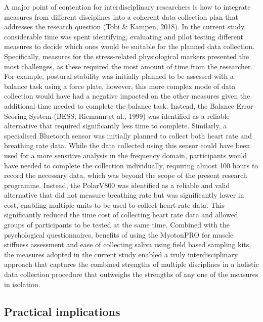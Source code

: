 \documentclass[
  english,
  man,floatsintext]{apa6}
\begin{document}
A major point of contention for interdisciplinary researchers is how to integrate measures from different disciplines into a coherent data collection plan that addresses the research question (Tobi \& Kampen, 2018).
In the current study, considerable time was spent identifying, evaluating and pilot testing different measures to decide which ones would be suitable for the planned data collection.
Specifically, measures for the stress-related physiological markers presented the most challenges, as these required the most amount of time from the researcher.
For example, postural stability was initially planned to be assessed with a balance task using a force plate, however, this more complex mode of data collection would have had a negative impacted on the other measures given the additional time needed to complete the balance task.
Instead, the Balance Error Scoring System (BESS; Riemann et al., 1999) was identified as a reliable alternative that required significantly less time to complete.
Similarly, a specialised Bluetooth sensor was initially planned to collect both heart rate and breathing rate data.
While the data collected using this sensor could have been used for a more sensitive analysis in the frequency domain, participants would have needed to complete the collection individually, requiring almost 100 hours to record the necessary data, which was beyond the scope of the present research programme.
Instead, the PolarV800 was identified as a reliable and valid alternative that did not measure breathing rate but was significantly lower in cost, enabling multiple units to be used to collect heart rate data.
This significantly reduced the time cost of collecting heart rate data and allowed groups of participants to be tested at the same time.
Combined with the psychological questionnaires, benefits of using the MyotonPRO for muscle stiffness assessment and ease of collecting saliva using field based sampling kits, the measures adopted in the current study enabled a truly interdisciplinary approach that captures the combined strengths of multiple disciplines in a holistic data collection procedure that outweighs the strengths of any one of the measures in isolation.

\hypertarget{practical-implications}{%
\subsection{Practical implications}\label{practical-implications}}
\end{document}
